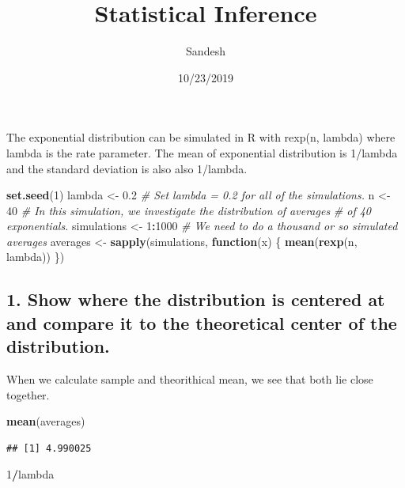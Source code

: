 \documentclass[]{article}
\title{Statistical Inference}
\author{Sandesh}
\date{10/23/2019}
\newenvironment{Shaded}{\begin{snugshade}}{\end{snugshade}}
\newcommand{\CommentTok}[1]{\textcolor[rgb]{0.56,0.35,0.01}{\textit{#1}}}
\newcommand{\ControlFlowTok}[1]{\textcolor[rgb]{0.13,0.29,0.53}{\textbf{#1}}}
\newcommand{\DecValTok}[1]{\textcolor[rgb]{0.00,0.00,0.81}{#1}}
\newcommand{\FloatTok}[1]{\textcolor[rgb]{0.00,0.00,0.81}{#1}}
\newcommand{\KeywordTok}[1]{\textcolor[rgb]{0.13,0.29,0.53}{\textbf{#1}}}
\newcommand{\NormalTok}[1]{#1}
\newcommand{\OperatorTok}[1]{\textcolor[rgb]{0.81,0.36,0.00}{\textbf{#1}}}
\newcommand{\StringTok}[1]{\textcolor[rgb]{0.31,0.60,0.02}{#1}}
\begin{document}
\maketitle

The exponential distribution can be simulated in R with rexp(n, lambda)
where lambda is the rate parameter. The mean of exponential distribution
is 1/lambda and the standard deviation is also also 1/lambda.

\begin{Shaded}
\begin{Highlighting}[]
\KeywordTok{set.seed}\NormalTok{(}\DecValTok{1}\NormalTok{)}
\NormalTok{lambda <-}\StringTok{ }\FloatTok{0.2} \CommentTok{# Set lambda = 0.2 for all of the simulations.}
\NormalTok{n <-}\StringTok{ }\DecValTok{40}       \CommentTok{# In this simulation, we investigate the distribution of averages}
              \CommentTok{# of 40 exponentials.}
\NormalTok{simulations <-}\StringTok{ }\DecValTok{1}\OperatorTok{:}\DecValTok{1000} \CommentTok{# We need to do a thousand or so simulated averages}
\NormalTok{averages <-}\StringTok{ }\KeywordTok{sapply}\NormalTok{(simulations, }\ControlFlowTok{function}\NormalTok{(x) \{ }\KeywordTok{mean}\NormalTok{(}\KeywordTok{rexp}\NormalTok{(n, lambda)) \})}
\end{Highlighting}
\end{Shaded}

\hypertarget{show-where-the-distribution-is-centered-at-and-compare-it-to-the-theoretical-center-of-the-distribution.}{%
\subsection{1. Show where the distribution is centered at and compare it
to the theoretical center of the
distribution.}\label{show-where-the-distribution-is-centered-at-and-compare-it-to-the-theoretical-center-of-the-distribution.}}

When we calculate sample and theorithical mean, we see that both lie
close together.

\begin{Shaded}
\begin{Highlighting}[]
\KeywordTok{mean}\NormalTok{(averages)}
\end{Highlighting}
\end{Shaded}

\begin{verbatim}
## [1] 4.990025
\end{verbatim}

\begin{Shaded}
\begin{Highlighting}[]
\DecValTok{1}\OperatorTok{/}\NormalTok{lambda}
\end{Highlighting}
\end{Shaded}
\end{document}
